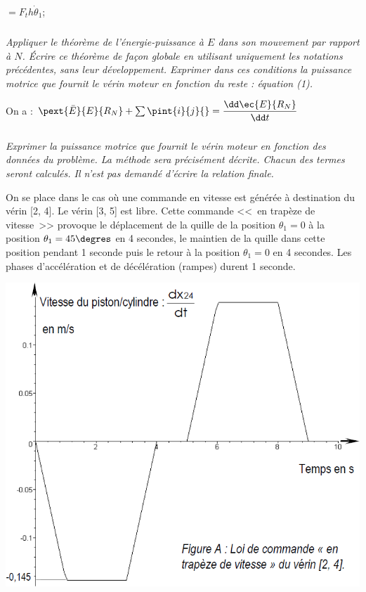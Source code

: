 \begin{multicols}{2}
\begin{corrige}
\begin{itemize}
$=F_t h \dot{\theta}_1$;

\end{itemize}
\end{corrige}
\else
\fi

\subparagraph{}\textit{Appliquer le théorème de l’énergie-puissance à $E$ dans son mouvement par rapport à $N$. Écrire ce
théorème de façon globale en utilisant uniquement les notations précédentes, sans leur
développement. Exprimer dans ces conditions la puissance motrice que fournit le vérin moteur en
fonction du reste : équation (1).}
\ifprof
\begin{corrige}
On a :
$\pext{\bar{E}}{E}{R_N} + \sum \pint{i}{j}{}=\dfrac{\dd \ec{E}{R_N}}{\dd t}$
\end{corrige}
\else
\fi

\else
\fi


\iftdifficile

\subparagraph{}\textit{ Exprimer la puissance motrice que fournit le vérin moteur en
fonction des données du problème. La méthode sera précisément décrite. Chacun des termes seront calculés. Il n'est pas demandé d'écrire la relation finale.}
\else
\fi

\ifprof
\else


On se place dans le cas où une commande en vitesse est générée à destination du vérin [2, 4]. Le vérin [3, 5]
est libre. Cette commande <<~en trapèze de vitesse~>>  provoque le déplacement de la quille de la position $\theta_1=0$
 à la position $\theta_1 = 45\degres$ en 4 secondes, le maintien de la quille dans cette position pendant 1 seconde puis le
 retour à la position $\theta_1=0$ en 4 secondes. Les phases d’accélération et de décélération (rampes) durent 1 seconde.


\begin{center}
\includegraphics[width=.6\linewidth]{images/fig_06}
\end{center}


\end{multicols}
